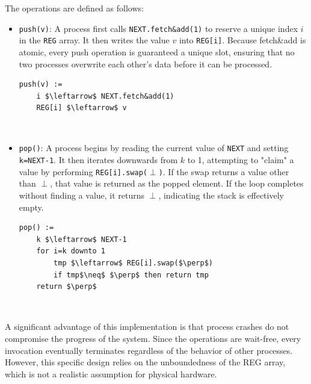 The operations are defined as follows:
\begin{itemize}
    \item \texttt{push(v)}: A process first calls \texttt{NEXT.fetch\&add(1)} to reserve a unique index $i$ in the \texttt{REG} array. It then writes the value $v$ into \texttt{REG[i]}. Because fetch\&add is atomic, every push operation is guaranteed a unique slot, ensuring that no two processes overwrite each other’s data before it can be processed.

\begin{minipage}{\textwidth}
\begin{lstlisting}[mathescape]
push(v) :=
    i $\leftarrow$ NEXT.fetch&add(1)
    REG[i] $\leftarrow$ v
\end{lstlisting}
\end{minipage}\\

    \item \texttt{pop()}: A process begins by reading the current value of \texttt{NEXT} and setting \texttt{k=NEXT-1}. It then iterates downwards from $k$ to 1, attempting to "claim" a value by performing \texttt{REG[i].swap(}$\perp$\texttt{)}. If the swap returns a value other than $\perp$, that value is returned as the popped element. If the loop completes without finding a value, it returns $\perp$, indicating the stack is effectively empty.

\begin{minipage}{\textwidth}
\begin{lstlisting}[mathescape]
pop() :=
    k $\leftarrow$ NEXT-1
    for i=k downto 1
        tmp $\leftarrow$ REG[i].swap($\perp$)
        if tmp$\neq$ $\perp$ then return tmp
    return $\perp$
\end{lstlisting}
\end{minipage}\\

\end{itemize}

A significant advantage of this implementation is that process crashes do not compromise the progress of the system. Since the operations are wait-free, every invocation eventually terminates regardless of the behavior of other processes. However, this specific design relies on the unboundedness of the REG array, which is not a realistic assumption for physical hardware.

